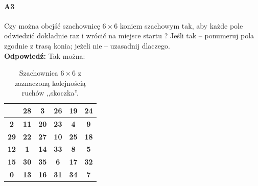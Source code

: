\documentclass[a4paper,12pt]{article}
\theoremstyle{definition}%
\theoremstyle{definition}
\theoremstyle{problem}
\begin{document}
\paragraph{A3}  Czy można obejść szachownicę  $6 \times 6$ koniem szachowym tak, aby każde pole odwiedzić dokładnie raz i wrócić na miejsce startu ?  Jeśli tak – ponumeruj pola zgodnie z trasą  konia; jeżeli nie – uzasadnij dlaczego. \\
\textbf{Odpowiedź:} Tak można:
\begin{table}[H]
\centering
\caption{Szachownica $6\times 6$ z zaznaczoną kolejnością ruchów ,,skoczka''.}
\begin{tabular}{|c|c|c|c|c|c|}\hline
\cellcolor[HTML]{9B9B9B}{\color[HTML]{656565} \textbf{21}} & \textbf{28} & \cellcolor[HTML]{9B9B9B}\textbf{3} & \textbf{26} & \cellcolor[HTML]{9B9B9B}\textbf{19} & \textbf{24} \\\hline
\textbf{2} & \cellcolor[HTML]{9B9B9B}\textbf{11} & \textbf{20} & \cellcolor[HTML]{9B9B9B}\textbf{23} & \textbf{4} & \cellcolor[HTML]{9B9B9B}\textbf{9} \\\hline
\cellcolor[HTML]{9B9B9B}\textbf{29} & \textbf{22} & \cellcolor[HTML]{9B9B9B}\textbf{27} & \textbf{10} & \cellcolor[HTML]{9B9B9B}\textbf{25} & \textbf{18} \\\hline
\textbf{12} & \cellcolor[HTML]{9B9B9B}\textbf{1} & \textbf{14} & \cellcolor[HTML]{9B9B9B}\textbf{33} & \textbf{8} & \cellcolor[HTML]{9B9B9B}\textbf{5} \\\hline
\cellcolor[HTML]{9B9B9B}\textbf{15} & \textbf{30} & \cellcolor[HTML]{9B9B9B}\textbf{35} & \textbf{6} & \cellcolor[HTML]{9B9B9B}\textbf{17} & \textbf{32} \\\hline
\textbf{0} & \cellcolor[HTML]{9B9B9B}\textbf{13} & \textbf{16} & \cellcolor[HTML]{9B9B9B}\textbf{31} & \textbf{34} & \cellcolor[HTML]{9B9B9B}\textbf{7}\\\hline
\end{tabular}
\end{table}
\end{document}

